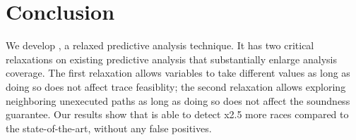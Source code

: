 \section{Conclusion}
We develop \sysname, a relaxed predictive analysis technique. It has two
critical relaxations on existing predictive analysis that substantially
enlarge analysis coverage. The first relaxation allows variables to 
take different values as long as doing so does not affect trace feasiblity;
the second relaxation allows exploring neighboring unexecuted paths as long
as doing so does not affect the soundness guarantee. Our results show that
\sysname is able to detect x2.5 more races compared to the state-of-the-art,
without any false positives.

%

